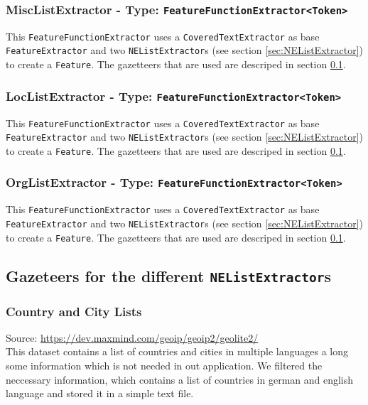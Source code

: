 \documentclass[11pt, english]{article}
\begin{document}
\subsubsection*{MiscListExtractor - Type: \texttt{FeatureFunctionExtractor<Token>}}
This \verb/FeatureFunctionExtractor/ uses a \verb/CoveredTextExtractor/ as base \verb/FeatureExtractor/ and two \verb/NEListExtractor/s (see section \ref{sec:NEListExtractor}) to create a \verb/Feature/. The gazetteers that are used are descriped in section \ref{sec:Gazetteers}.

\subsubsection*{LocListExtractor - Type: \texttt{FeatureFunctionExtractor<Token>}}
This \verb/FeatureFunctionExtractor/ uses a \verb/CoveredTextExtractor/ as base \verb/FeatureExtractor/ and two \verb/NEListExtractor/s (see section \ref{sec:NEListExtractor}) to create a \verb/Feature/. The gazetteers that are used are descriped in section \ref{sec:Gazetteers}.

\subsubsection*{OrgListExtractor - Type: \texttt{FeatureFunctionExtractor<Token>}}
This \verb/FeatureFunctionExtractor/ uses a \verb/CoveredTextExtractor/ as base \verb/FeatureExtractor/ and two \verb/NEListExtractor/s (see section \ref{sec:NEListExtractor}) to create a \verb/Feature/. The gazetteers that are used are descriped in section \ref{sec:Gazetteers}.

\subsection{Gazeteers for the different \texttt{NEListExtractor}s}
\label{sec:Gazetteers}

\subsubsection*{Country and City Lists}
Source: \url{https://dev.maxmind.com/geoip/geoip2/geolite2/}\\
This dataset contains a list of countries and cities in multiple languages a long some information which is not needed in out application. We filtered the neccessary information, which contains a list of countries in german and english language and stored it in a simple text file.
\end{document}
